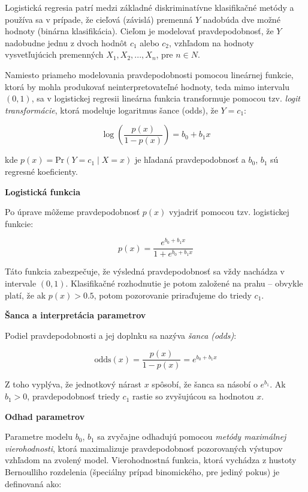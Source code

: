 Logistická regresia patrí medzi základné diskriminatívne klasifikačné metódy a používa sa v prípade, že cieľová (závislá) premenná $Y$ nadobúda dve možné hodnoty (binárna klasifikácia). Cieľom je modelovať pravdepodobnosť, že $Y$ nadobudne jednu z dvoch hodnôt $c_1$ alebo $c_2$, vzhľadom na hodnoty vysvetľujúcich premenných $X_1, X_2, ..., X_n$, pre $n \in N$.

Namiesto priameho modelovania pravdepodobnosti pomocou lineárnej funkcie, ktorá by mohla produkovať neinterpretovateľné hodnoty, teda mimo intervalu $(0,1)$, sa v logistickej regresii lineárna funkcia transformuje pomocou tzv. \textit{logit transformácie}, ktorá modeluje logaritmus šance (odds), že $Y = c_1$:

\begin{equation}
\log\left( \frac{p(x)}{1 - p(x)} \right) = b_0 + b_1 x
\end{equation}

kde $p(x) = \mathrm{Pr}(Y=c_1\mid X=x)$ je hľadaná pravdepodobnosť a $b_0$, $b_1$ sú regresné koeficienty.

\textbf{Logistická funkcia}

Po úprave môžeme pravdepodobnosť $p(x)$ vyjadriť pomocou tzv. logistickej funkcie:

\begin{equation}
p(x) = \frac{e^{b_0 + b_1 x}}{1 + e^{b_0 + b_1 x}}
\end{equation}

Táto funkcia zabezpečuje, že výsledná pravdepodobnosť sa vždy nachádza v intervale $(0,1)$. Klasifikačné rozhodnutie je potom založené na prahu – obvykle platí, že ak $p(x) > 0.5$, potom pozorovanie priraďujeme do triedy $c_1$.

\textbf{Šanca a interpretácia parametrov}

Podiel pravdepodobnosti a jej doplnku sa nazýva \textit{šanca (odds)}:

\begin{equation}
\text{odds}(x) = \frac{p(x)}{1 - p(x)} = e^{b_0 + b_1 x}
\end{equation}

Z toho vyplýva, že jednotkový nárast $x$ spôsobí, že šanca sa násobí o $e^{b_1}$. Ak $b_1 > 0$, pravdepodobnosť triedy $c_1$ rastie so zvyšujúcou sa hodnotou $x$.

\textbf{Odhad parametrov}

Parametre modelu $b_0$, $b_1$ sa zvyčajne odhadujú pomocou \textit{metódy maximálnej vierohodnosti}, ktorá maximalizuje pravdepodobnosť pozorovaných výstupov vzhľadom na zvolený model. Vierohodnostná funkcia, ktorá vychádza z hustoty Bernoulliho rozdelenia (špeciálny prípad binomického, pre jediný pokus) je definovaná ako:

